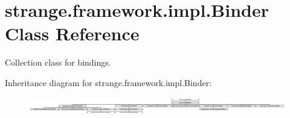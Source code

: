 \hypertarget{classstrange_1_1framework_1_1impl_1_1_binder}{\section{strange.\-framework.\-impl.\-Binder Class Reference}
\label{classstrange_1_1framework_1_1impl_1_1_binder}
}


Collection class for bindings.  


Inheritance diagram for strange.\-framework.\-impl.\-Binder\-:\begin{figure}[H]
\begin{center}
\leavevmode
\includegraphics[height=0.768176cm]{classstrange_1_1framework_1_1impl_1_1_binder}
\end{center}
\end{figure}
